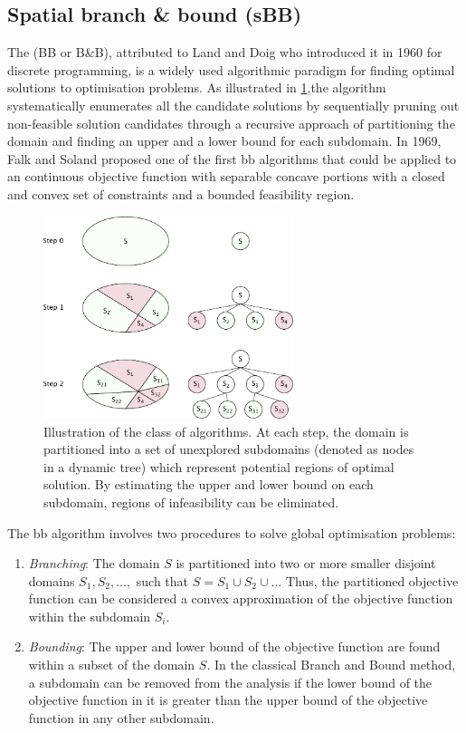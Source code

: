\subsection{Spatial branch \& bound (sBB)}
    The  (BB or B\&B), attributed to Land and Doig \cite{Land:1960aa} who introduced it in 1960 for discrete programming, is a widely used algorithmic paradigm for finding optimal solutions to optimisation problems. As illustrated in \ref{fig:BB},the algorithm systematically enumerates all the candidate solutions by sequentially pruning out non-feasible solution candidates through a recursive approach of partitioning the domain and finding an upper and a lower bound for each subdomain. In 1969, Falk and Soland \cite{Falk69} proposed one of the first \gls{bb} algorithms that could be applied to an continuous objective function with separable concave portions with a closed and convex set of constraints and a bounded feasibility region.
		\begin{figure}[htbp]
		\centering
		\includegraphics[width=0.65\textwidth]{figures/chapter-6/BB.pdf}
		\caption[Illustration of Branch \& Bound (BB) class of algorithms.]{Illustration of the  class of algorithms. At each step, the domain is partitioned into a set of unexplored subdomains (denoted as nodes in a dynamic tree) which represent potential regions of optimal solution. By estimating the upper and lower bound on each subdomain, regions of infeasibility can be eliminated.}
		\label{fig:BB}
	\end{figure}
The \gls{bb} algorithm involves two procedures to solve global optimisation problems:
	\begin{enumerate}
		\item \emph{Branching}: The domain $S$ is partitioned into two or more smaller disjoint domains $S_1,S_2,\dots,$ such that $S = S_1 \cup S_2 \cup \dots$ Thus, the partitioned objective function can be considered a convex approximation of the objective function within the subdomain $S_i$.
		\item \emph{Bounding}: The upper and lower bound of the objective function are found within a subset of the domain $S$. In the classical Branch and Bound method, a subdomain can be removed from the analysis if the lower bound of the objective function in it is greater than the upper bound of the objective function in any other subdomain.
	\end{enumerate}
